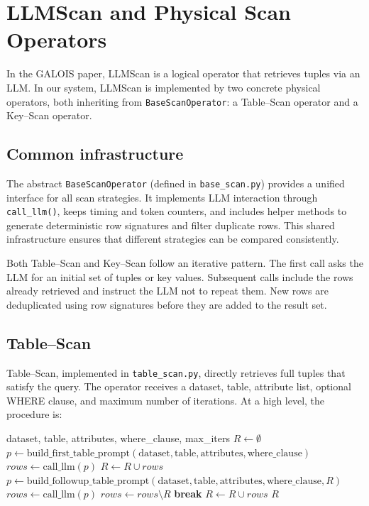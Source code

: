 \documentclass[11pt]{article}
\begin{document}
\clearpage
\section{LLMScan and Physical Scan Operators}

In the GALOIS paper, LLMScan is a logical operator that retrieves tuples via an LLM. In our system, LLMScan is implemented by two concrete physical operators, both inheriting from \texttt{BaseScanOperator}: a Table–Scan operator and a Key–Scan operator.

\subsection{Common infrastructure}

The abstract \texttt{BaseScanOperator} (defined in \texttt{base\_scan.py}) provides a unified interface for all scan strategies. It implements LLM interaction through \texttt{call\_llm()}, keeps timing and token counters, and includes helper methods to generate deterministic row signatures and filter duplicate rows. This shared infrastructure ensures that different strategies can be compared consistently.

Both Table–Scan and Key–Scan follow an iterative pattern. The first call asks the LLM for an initial set of tuples or key values. Subsequent calls include the rows already retrieved and instruct the LLM not to repeat them. New rows are deduplicated using row signatures before they are added to the result set.

\subsection{Table–Scan}

Table–Scan, implemented in \texttt{table\_scan.py}, directly retrieves full tuples that satisfy the query. The operator receives a dataset, table, attribute list, optional WHERE clause, and maximum number of iterations. At a high level, the procedure is:

\begin{algorithm}[h]
\caption{Table–Scan}
\begin{algorithmic}[1]
\Require dataset, table, attributes, where\_clause, max\_iters
\State $R \gets \emptyset$ 
\State $p \gets \text{build\_first\_table\_prompt}(\text{dataset},\text{table},\text{attributes},\text{where\_clause})$
\State $rows \gets \text{call\_llm}(p)$
\State $R \gets R \cup rows$
  \State $p \gets \text{build\_followup\_table\_prompt}(\text{dataset},\text{table},\text{attributes},\text{where\_clause},R)$
  \State $rows \gets \text{call\_llm}(p)$
  \State $rows \gets rows \setminus R$ 
   \State \textbf{break} \EndIf
  \State $R \gets R \cup rows$
\EndFor
\State \Return $R$
\end{algorithmic}
\end{algorithm}
\end{document}
